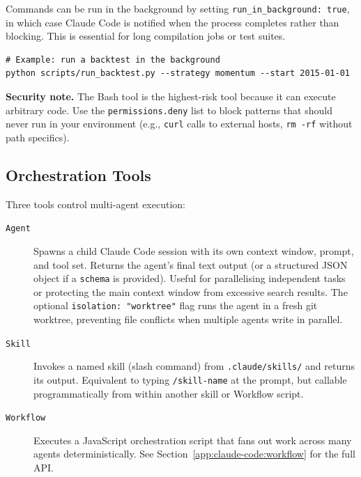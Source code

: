 Commands can be run in the background by setting \texttt{run\_in\_background:
true}, in which case Claude Code is notified when the process completes rather
than blocking.  This is essential for long compilation jobs or test suites.

\begin{verbatim}
# Example: run a backtest in the background
python scripts/run_backtest.py --strategy momentum --start 2015-01-01
\end{verbatim}

\textbf{Security note.}  The Bash tool is the highest-risk tool because it can
execute arbitrary code.  Use the \texttt{permissions.deny} list to block
patterns that should never run in your environment (e.g., \texttt{curl} calls
to external hosts, \texttt{rm -rf} without path specifics).

\subsection{Orchestration Tools}
\label{app:claude-code:tools-orchestration}

Three tools control multi-agent execution:

\begin{description}
  \item[\texttt{Agent}] Spawns a child Claude Code session with its own context
        window, prompt, and tool set.  Returns the agent's final text output (or
        a structured JSON object if a \texttt{schema} is provided).  Useful for
        parallelising independent tasks or protecting the main context window
        from excessive search results.  The optional
        \texttt{isolation: "worktree"} flag runs the agent in a fresh git
        worktree, preventing file conflicts when multiple agents write in
        parallel.

  \item[\texttt{Skill}] Invokes a named skill (slash command) from
        \texttt{.claude/skills/} and returns its output.  Equivalent to typing
        \texttt{/skill-name} at the prompt, but callable programmatically from
        within another skill or Workflow script.

  \item[\texttt{Workflow}] Executes a JavaScript orchestration script that fans
        out work across many agents deterministically.  See
        Section~\ref{app:claude-code:workflow} for the full API.
\end{description}

